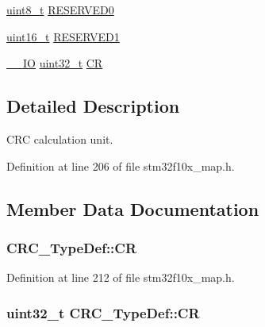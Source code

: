 \begin{DoxyCompactItemize}
\hyperlink{_p_e___types_8h_aba7bc1797add20fe3efdf37ced1182c5}{uint8\+\_\+t} \hyperlink{struct_c_r_c___type_def_a70dfd1730dba65041550ef55a44db87c}{R\+E\+S\+E\+R\+V\+E\+D0}
\item 
\hyperlink{_p_e___types_8h_a1f1825b69244eb3ad2c7165ddc99c956}{uint16\+\_\+t} \hyperlink{struct_c_r_c___type_def_a8b205c6e25b1808ac016db2356b3021d}{R\+E\+S\+E\+R\+V\+E\+D1}
\item 
\hyperlink{group___c_m_s_i_s___c_m3__core__definitions_gaec43007d9998a0a0e01faede4133d6be}{\+\_\+\+\_\+\+IO} \hyperlink{_p_e___types_8h_a33594304e786b158f3fb30289278f5af}{uint32\+\_\+t} \hyperlink{struct_c_r_c___type_def_af33fa5c173e1c102e6d0242fe60e569f}{CR}
\end{DoxyCompactItemize}


\subsection{Detailed Description}
C\+RC calculation unit. 

Definition at line 206 of file stm32f10x\+\_\+map.\+h.



\subsection{Member Data Documentation}
\subsubsection[{\texorpdfstring{CR}{CR}}]{ C\+R\+C\+\_\+\+Type\+Def\+::\+CR}\hypertarget{struct_c_r_c___type_def_adce7e083b6b0fd717229f0cbaf7fbbb8}{}\label{struct_c_r_c___type_def_adce7e083b6b0fd717229f0cbaf7fbbb8}


Definition at line 212 of file stm32f10x\+\_\+map.\+h.

\subsubsection[{\texorpdfstring{CR}{CR}}]{ {\bf uint32\+\_\+t} C\+R\+C\+\_\+\+Type\+Def\+::\+CR}\hypertarget{struct_c_r_c___type_def_af33fa5c173e1c102e6d0242fe60e569f}{}\label{struct_c_r_c___type_def_af33fa5c173e1c102e6d0242fe60e569f}


